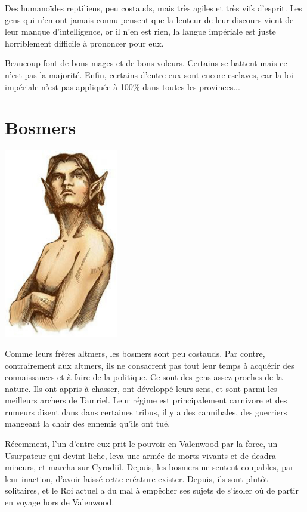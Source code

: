   Des humanoïdes reptiliens, peu costauds, mais très agiles et très vifs d'esprit. Les gens qui n'en ont jamais connu pensent que la lenteur de leur discours vient de leur manque d'intelligence, or il n'en est rien, la langue impériale est juste horriblement difficile à prononcer pour eux.
  
  Beaucoup font de bons mages et de bons voleurs. Certains se battent mais ce n'est pas la majorité. Enfin, certains d'entre eux sont encore esclaves, car la loi impériale n'est pas appliquée à 100\% dans toutes les provinces...

  \section{Bosmers}
  
  \begin{center}
  \includegraphics[width=5cm]{images/race_bosmer.jpg}
  \end{center}
  
  Comme leurs frères altmers, les bosmers sont peu costauds. Par contre, contrairement aux altmers, ils ne consacrent pas tout leur temps à acquérir des connaissances et à faire de la politique. Ce sont des gens assez proches de la nature. Ils ont appris à chasser, ont développé leurs sens, et sont parmi les meilleurs archers de Tamriel. Leur régime est principalement carnivore et des rumeurs disent dans dans certaines tribus, il y a des cannibales, des guerriers mangeant la chair des ennemis qu'ils ont tué.
  
  Récemment, l'un d'entre eux prit le pouvoir en Valenwood par la force, un Usurpateur qui devint liche, leva une armée de morts-vivants et de deadra mineurs, et marcha sur Cyrodiil. Depuis, les bosmers ne sentent coupables, par leur inaction, d'avoir laissé cette créature exister. Depuis, ils sont plutôt solitaires, et le Roi actuel a du mal à empêcher ses sujets de s'isoler où de partir en voyage hors de Valenwood.

